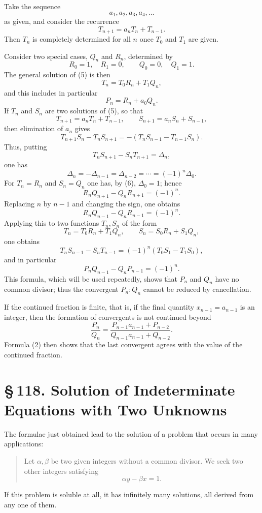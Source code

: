 \documentclass[11pt]{article}
\providecommand{\sect}[2]{\section*{\S\,#1. #2}}
\begin{document}
Take the sequence
\[
        a_1,a_2,a_3,a_4,\ldots
\]
as given, and consider the recurrence
\[
\tag{5}        T_{n+1}=a_nT_n+T_{n-1}.
\]
Then $T_n$ is completely determined for all $n$ once $T_0$ and $T_1$ are given.

Consider two special cases, $Q_n$ and $R_n$, determined by
\[
\tag{6}        R_0=1,\quad R_1=0,
        \qquad
        Q_0=0,\quad Q_1=1.
\]
The general solution of (5) is then
\[
\tag{7}        T_n=T_0R_n+T_1Q_n,
\]
and this includes in particular
\[
\tag{8}        P_n=R_n+a_0Q_n.
\]
If $T_n$ and $S_n$ are two solutions of (5), so that
\[
        T_{n+1}=a_nT_n+T_{n-1},\qquad
        S_{n+1}=a_nS_n+S_{n-1},
\]
then elimination of $a_n$ gives
\[
        T_{n+1}S_n-T_nS_{n+1}=-(T_nS_{n-1}-T_{n-1}S_n).
\]
Thus, putting
\[
        T_nS_{n+1}-S_nT_{n+1}=\Delta_n,
\]
one has
\[
\tag{9}        \Delta_n=-\Delta_{n-1}=\Delta_{n-2}=\cdots=(-1)^n\Delta_0.
\]
For $T_n=R_n$ and $S_n=Q_n$ one has, by (6), $\Delta_0=1$; hence
\[
        R_nQ_{n+1}-Q_nR_{n+1}=(-1)^n.
\]
Replacing $n$ by $n-1$ and changing the sign, one obtains
\[
\tag{10}       R_nQ_{n-1}-Q_nR_{n-1}=(-1)^n.
\]
Applying this to two functions $T_n,S_n$ of the form
\[
        T_n=T_0R_n+T_1Q_n,
        \qquad
        S_n=S_0R_n+S_1Q_n,
\]
one obtains
\[
        T_nS_{n-1}-S_nT_{n-1}=(-1)^n(T_0S_1-T_1S_0),
\]
and in particular
\[
\tag{11}       P_nQ_{n-1}-Q_nP_{n-1}=(-1)^n.
\]
This formula, which will be used repeatedly, shows that $P_n$ and $Q_n$ have no common divisor; thus the convergent $P_n:Q_n$ cannot be reduced by cancellation.

If the continued fraction is finite, that is, if the final quantity $x_{n-1}=a_{n-1}$ is an integer, then the formation of convergents is not continued beyond
\[
        \frac{P_n}{Q_n}
        =\frac{P_{n-1}a_{n-1}+P_{n-2}}
               {Q_{n-1}a_{n-1}+Q_{n-2}}.
\]
Formula (2) then shows that the last convergent agrees with the value of the continued fraction.

\sect{118}{Solution of Indeterminate Equations with Two Unknowns}

The formulae just obtained lead to the solution of a problem that occurs in many applications:
\begin{quote}
Let $\alpha,\beta$ be two given integers without a common divisor. We seek two other integers satisfying
\[
\tag{1}        \alpha y-\beta x=1.
\]
\end{quote}
If this problem is soluble at all, it has infinitely many solutions, all derived from any one of them.
\end{document}

